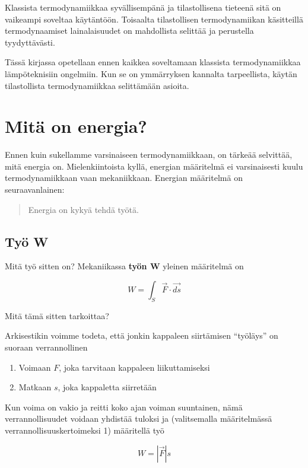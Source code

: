 \documentclass[12pt,a4paper,finnish]{book}
\begin{document}
Klassista termodynamiikkaa syvällisempänä ja tilastollisena tieteenä sitä on vaikeampi soveltaa käytäntöön. 
Toisaalta tilastollisen termodynamiikan käsitteillä termodynaamiset lainalaisuudet on mahdollista selittää ja 
perustella tyydyttävästi.

Tässä kirjassa opetellaan ennen kaikkea soveltamaan klassista termodynamiikkaa lämpöteknisiin ongelmiin. 
Kun se on ymmärryksen kannalta tarpeellista, käytän tilastollista termodynamiikkaa selittämään asioita.

\section{Mitä on energia?}

Ennen kuin sukellamme varsinaiseen termodynamiikkaan, on tärkeää selvittää, mitä energia on. Mielenkiintoista 
kyllä, energian määritelmä ei varsinaisesti kuulu termodynamiikkaan vaan mekaniikkaan. Energian määritelmä on 
seuraavanlainen:

\begin{quote}
 Energia on kykyä tehdä työtä.
\end{quote}

\subsection{Työ W}

Mitä työ sitten on? Mekaniikassa \textbf{työn W} yleinen määritelmä on

\begin{equation}
\label{eq:W}
 W = \int_S \vec{F} \cdot \vec{ds}
\end{equation}

Mitä tämä sitten tarkoittaa? 

Arkisestikin voimme todeta, että jonkin kappaleen siirtämisen ``työläys'' on suoraan verrannollinen

\begin{enumerate}
 \item Voimaan $F$, joka tarvitaan kappaleen liikuttamiseksi
 \item Matkaan $s$, joka kappaletta siirretään
\end{enumerate}

Kun voima on vakio ja reitti koko ajan voiman suuntainen, nämä verrannollisuudet voidaan yhdistää tuloksi ja 
(valitsemalla määritelmässä verrannollisuuskertoimeksi 1) määritellä työ

\begin{equation}
 W = |\vec{F}|s
\end{equation}
\end{document}
